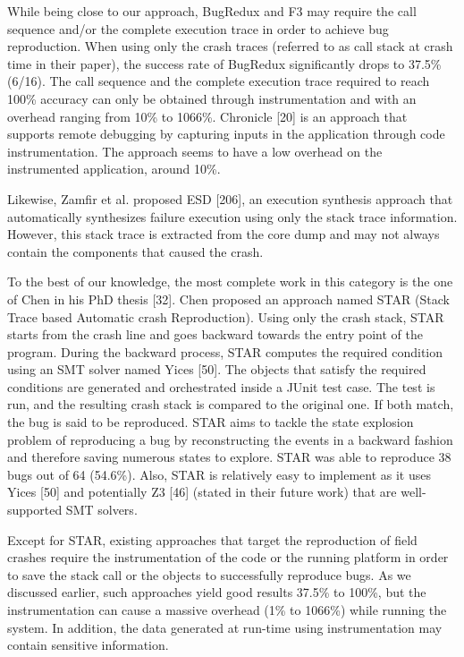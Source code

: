 \documentclass[12pt]{report}
\begin{document}
While being close to our approach, BugRedux and F3 may require the call
sequence and/or the complete execution trace in order to achieve bug
reproduction. When using only the crash traces (referred to as call
stack at crash time in their paper), the success rate of BugRedux
significantly drops to 37.5\% (6/16). The call sequence and the complete
execution trace required to reach 100\% accuracy can only be obtained
through instrumentation and with an overhead ranging from 10\% to
1066\%. Chronicle {[}20{]} is an approach that supports remote debugging
by capturing inputs in the application through code instrumentation. The
approach seems to have a low overhead on the instrumented application,
around 10\%.

Likewise, Zamfir et al. proposed ESD {[}206{]}, an execution synthesis
approach that automatically synthesizes failure execution using only the
stack trace information. However, this stack trace is extracted from the
core dump and may not always contain the components that caused the
crash.

To the best of our knowledge, the most complete work in this category is
the one of Chen in his PhD thesis {[}32{]}. Chen proposed an approach
named STAR (Stack Trace based Automatic crash Reproduction). Using only
the crash stack, STAR starts from the crash line and goes backward
towards the entry point of the program. During the backward process,
STAR computes the required condition using an SMT solver named Yices
{[}50{]}. The objects that satisfy the required conditions are generated
and orchestrated inside a JUnit test case. The test is run, and the
resulting crash stack is compared to the original one. If both match,
the bug is said to be reproduced. STAR aims to tackle the state
explosion problem of reproducing a bug by reconstructing the events in a
backward fashion and therefore saving numerous states to explore. STAR
was able to reproduce 38 bugs out of 64 (54.6\%). Also, STAR is
relatively easy to implement as it uses Yices {[}50{]} and potentially
Z3 {[}46{]} (stated in their future work) that are well-supported SMT
solvers.

Except for STAR, existing approaches that target the reproduction of
field crashes require the instrumentation of the code or the running
platform in order to save the stack call or the objects to successfully
reproduce bugs. As we discussed earlier, such approaches yield good
results 37.5\% to 100\%, but the instrumentation can cause a massive
overhead (1\% to 1066\%) while running the system. In addition, the data
generated at run-time using instrumentation may contain sensitive
information.
\end{document}
